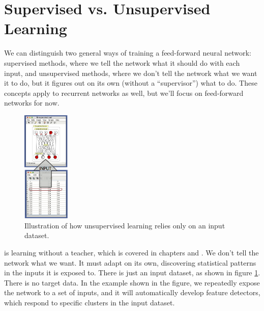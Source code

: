 
\section{Supervised vs. Unsupervised Learning}


We can distinguish two general ways of training a feed-forward neural network: supervised methods, where we tell the network what it should do with each input, and unsupervised methods, where we don't tell the network what we want it to do, but it figures out on its own (without a ``supervisor'') what to do. These concepts apply to recurrent networks as well, but we'll focus on feed-forward networks for now.

\begin{figure}[h]
\centering
\includegraphics[width=0.2\textwidth]{./images/dataset_unsupervised.png}
\caption[Simbrain screenshot with graphical elements added by Pamela Payne.]{Illustration of how unsupervised learning relies only on an input dataset.}
\label{unsupervised_learning}
\end{figure}

  is learning without a teacher, which is covered in chapters  and . We don't tell the network what we want. It must adapt on its own, discovering statistical patterns in the inputs it is exposed to. There is just an input dataset, as shown in figure \ref{unsupervised_learning}. There is no target data.  In the example shown in the figure, we repeatedly expose the network to a set of inputs, and it will automatically develop feature detectors, which respond to specific clusters in the input dataset.

